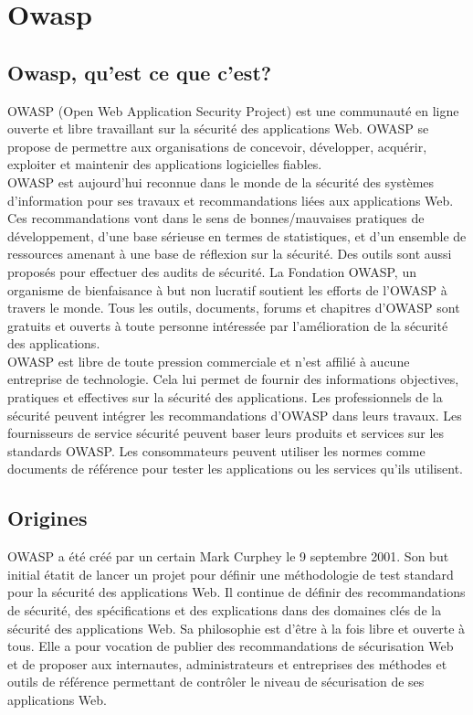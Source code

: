 \chapter{Owasp}
\section{Owasp, qu'est ce que c'est?}
OWASP (Open Web Application Security Project) est une communauté en ligne ouverte et libre travaillant sur la sécurité des applications Web. OWASP se propose de permettre aux organisations de concevoir, développer, acquérir, exploiter et maintenir des applications logicielles fiables.\\
OWASP est aujourd'hui reconnue dans le monde de la sécurité des systèmes d'information pour ses travaux et recommandations liées aux applications Web. Ces recommandations vont dans le sens de bonnes/mauvaises pratiques de développement, d’une base sérieuse en termes de statistiques, et d’un ensemble de ressources amenant à une base de réflexion sur la sécurité. Des outils sont aussi proposés pour effectuer des audits de sécurité.
La Fondation OWASP, un organisme de bienfaisance à but non lucratif soutient les efforts de l'OWASP à travers le monde. Tous les outils, documents, forums et chapitres d'OWASP sont gratuits et ouverts à toute personne intéressée par l'amélioration de la sécurité des applications.\\
OWASP est libre de toute pression commerciale et n'est affilié à aucune entreprise de technologie. Cela lui permet de fournir des informations objectives, pratiques et effectives sur la sécurité des applications. 
Les professionnels de la sécurité peuvent intégrer les recommandations d'OWASP dans leurs travaux. Les fournisseurs de service sécurité peuvent baser leurs produits et services sur les standards OWASP. Les consommateurs peuvent utiliser les normes comme documents de référence pour tester les applications ou les services qu'ils utilisent.\\

\section{Origines}
OWASP a été créé par un certain Mark Curphey le 9 septembre 2001. Son but initial étatit de lancer un projet pour définir une méthodologie de test standard pour la sécurité des applications Web. Il continue de définir des recommandations de sécurité, des spécifications et des explications dans des domaines clés de la sécurité des applications Web.
Sa philosophie est d'être à la fois libre et ouverte à tous. Elle a pour vocation de publier des recommandations de sécurisation Web et de proposer aux internautes, administrateurs et entreprises des méthodes et outils de référence permettant de contrôler le niveau de sécurisation de ses applications Web.


